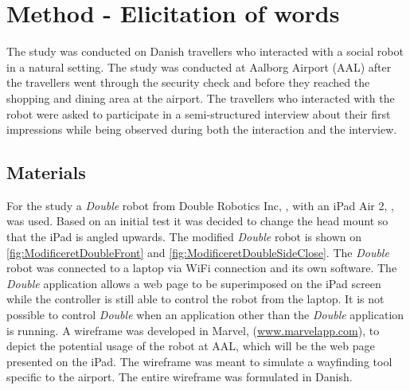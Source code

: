\section{Method {\color{red}- Elicitation of words}}
\label{MethodElicitation}
%
The study was conducted on Danish travellers who interacted with a social robot in a natural setting. The study was conducted at Aalborg Airport (AAL) after the travellers went through the security check and before they reached the shopping and dining area at the airport. The travellers who interacted with the robot were asked to participate in a semi-structured interview about their first impressions while being observed during both the interaction and the interview. 

\subsection{Materials}
For the study a \textit{Double} robot from Double Robotics Inc, \cite{WEB:Double}, with an iPad Air 2, \cite{WEB:iPadAir2}, was used. Based on an initial test it was decided to change the head mount so that the iPad is angled upwards. The modified \textit{Double} robot is shown on \autoref{fig:ModificeretDoubleFront} and \autoref{fig:ModificeretDoubleSideClose}. The \textit{Double} robot was connected to a laptop via WiFi connection and its own software. The \textit{Double} application allows a web page to be superimposed on the iPad screen while the controller is still able to control the robot from the laptop. It is not possible to control \textit{Double} when an application other than the \textit{Double} application is running. A wireframe was developed in Marvel, (\url{www.marvelapp.com}), to depict the potential usage of the robot at AAL, which will be the web page presented on the iPad. The wireframe was meant to simulate a wayfinding tool specific to the airport. The entire wireframe was formulated in Danish.

